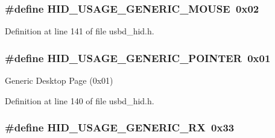 \subsubsection[{\texorpdfstring{H\+I\+D\+\_\+\+U\+S\+A\+G\+E\+\_\+\+G\+E\+N\+E\+R\+I\+C\+\_\+\+M\+O\+U\+SE}{HID_USAGE_GENERIC_MOUSE}}]{\setlength{\rightskip}{0pt plus 5cm}\#define H\+I\+D\+\_\+\+U\+S\+A\+G\+E\+\_\+\+G\+E\+N\+E\+R\+I\+C\+\_\+\+M\+O\+U\+SE~0x02}\hypertarget{group__USBD__HID_ga1add1140da206a493a360695713a22a3}{}\label{group__USBD__HID_ga1add1140da206a493a360695713a22a3}


Definition at line 141 of file usbd\+\_\+hid.\+h.

\subsubsection[{\texorpdfstring{H\+I\+D\+\_\+\+U\+S\+A\+G\+E\+\_\+\+G\+E\+N\+E\+R\+I\+C\+\_\+\+P\+O\+I\+N\+T\+ER}{HID_USAGE_GENERIC_POINTER}}]{\setlength{\rightskip}{0pt plus 5cm}\#define H\+I\+D\+\_\+\+U\+S\+A\+G\+E\+\_\+\+G\+E\+N\+E\+R\+I\+C\+\_\+\+P\+O\+I\+N\+T\+ER~0x01}\hypertarget{group__USBD__HID_ga641222beb63bba22954b45dd26c3f948}{}\label{group__USBD__HID_ga641222beb63bba22954b45dd26c3f948}
Generic Desktop Page (0x01) 

Definition at line 140 of file usbd\+\_\+hid.\+h.

\subsubsection[{\texorpdfstring{H\+I\+D\+\_\+\+U\+S\+A\+G\+E\+\_\+\+G\+E\+N\+E\+R\+I\+C\+\_\+\+RX}{HID_USAGE_GENERIC_RX}}]{\setlength{\rightskip}{0pt plus 5cm}\#define H\+I\+D\+\_\+\+U\+S\+A\+G\+E\+\_\+\+G\+E\+N\+E\+R\+I\+C\+\_\+\+RX~0x33}\hypertarget{group__USBD__HID_ga85e458d94cb9d3d24e6404990a84ac9f}{}\label{group__USBD__HID_ga85e458d94cb9d3d24e6404990a84ac9f}


